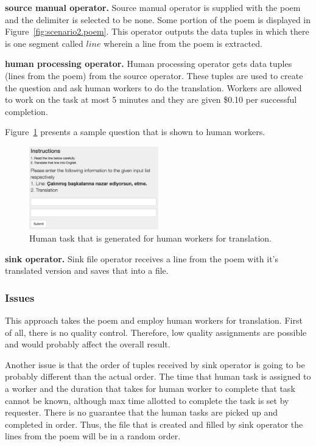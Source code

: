 \textbf{source manual operator.}
Source manual operator is supplied with the poem and the delimiter is selected to be none. Some portion of the poem is displayed in Figure~\ref{fig:scenario2.poem}. This operator outputs the data tuples in which there is one segment called $line$ wherein a line from the poem is extracted.


\textbf{human processing operator.}
Human processing operator gets data tuples (lines from the poem) from the source operator. These tuples are used to create the question and ask human workers to do the translation. Workers are allowed to work on the task at most 5 minutes and they are given \$0.10 per successful completion.

Figure~\ref{fig:scenario2.1h} presents a sample question that is shown to human workers.

\begin{figure}[ht]
	\centering
	\includegraphics[width=0.5\textwidth]{figures/scenarios/scenario2_1h.png}
	\caption{Human task that is generated for human workers for translation.}
	\label{fig:scenario2.1h}
\end{figure}


\textbf{sink operator.}
Sink file operator receives a line from the poem with it's translated version and saves that into a file.


\subsubsection{Issues}
This approach takes the poem and employ human workers for translation. First of all, there is no quality control. Therefore, low quality assignments are possible and would probably affect the overall result.

Another issue is that the order of tuples received by sink operator is going to be probably different than the actual order. The time that human task is assigned to a worker and the duration that takes for human worker to complete that task cannot be known, although max time allotted to complete the task is set by requester. There is no guarantee that the human tasks are picked up and completed in order. Thus, the file that is created and filled by sink operator the lines from the poem will be in a random order.

